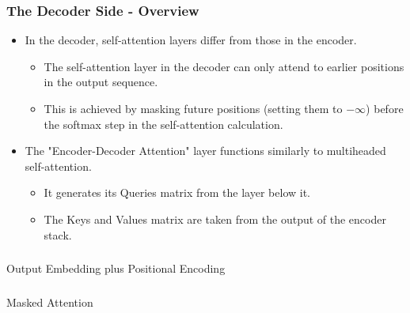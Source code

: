 \begin{frame}[fragile]\frametitle{The Decoder Side - Overview}



\begin{itemize}
  \item In the decoder, self-attention layers differ from those in the encoder.
    \begin{itemize}
      \item The self-attention layer in the decoder can only attend to earlier positions in the output sequence.
      \item This is achieved by masking future positions (setting them to $-\infty$) before the softmax step in the self-attention calculation.
    \end{itemize}
  \item The "Encoder-Decoder Attention" layer functions similarly to multiheaded self-attention.
    \begin{itemize}
      \item It generates its Queries matrix from the layer below it.
      \item The Keys and Values matrix are taken from the output of the encoder stack.
    \end{itemize}
\end{itemize}
\end{frame}

\begin{frame}[fragile]\frametitle{}
\begin{center}
{\Large Output Embedding plus Positional Encoding}
\end{center}
\end{frame}

\begin{frame}[fragile]\frametitle{}
\begin{center}
{\Large Masked Attention}
\end{center}
\end{frame}

